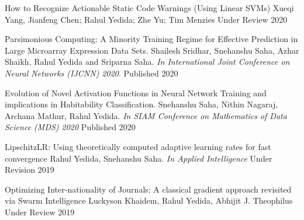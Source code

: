 


\begin{cvhonors}

    \cvhonor
        {How to Recognize Actionable Static Code Warnings (Using Linear SVMs)}
        {Xueqi Yang, Jianfeng Chen; Rahul Yedida; Zhe Yu; Tim Menzies}
        {Under Review}
        {2020}

    \cvhonor
        {Parsimonious Computing: A Minority Training Regime for Effective Prediction in Large Microarray Expression Data Sets.}
        {Shailesh Sridhar, Snehanshu Saha, Azhar Shaikh, Rahul Yedida and Sriparna Saha.  \textit{In International Joint Conference on Neural Networks (IJCNN) 2020}.}
        {Published}
        {2020}

    \cvhonor
        {Evolution of Novel Activation Functions in Neural Network Training and implications in Habitability Classification.}
        {Snehanshu Saha, Nithin Nagaraj, Archana Mathur, Rahul Yedida. \textit{In SIAM Conference on Mathematics of Data Science (MDS) 2020}}
        {Published}
        {2020}

  \cvhonor
    {LipschitzLR: Using theoretically computed adaptive learning rates for fast convergence}
    {Rahul Yedida, Snehanshu Saha. \textit{In Applied Intelligence}}
    {Under Revision} %
    {2019} %

  \cvhonor
    {Optimizing Inter-nationality of Journals: A classical gradient approach revisited via Swarm Intelligence}
    {Luckyson Khaidem, Rahul Yedida, Abhijit J. Theophilus}
    {Under Review} %
    {2019} %
    
\end{cvhonors}
